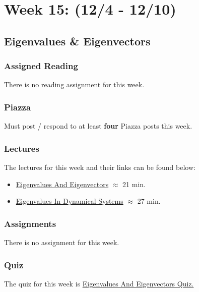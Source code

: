 \clearpage
\chapter{Week 15: (12/4 - 12/10)}

\section{Eigenvalues \& Eigenvectors}

\subsection{Assigned Reading}

There is no reading assignment for this week.

\subsection{Piazza}

Must post / respond to at least \textbf{four} Piazza posts this week.  

\subsection{Lectures}

The lectures for this week and their links can be found below:

\begin{itemize}
    \item \href{https://applied.cs.colorado.edu/mod/hvp/view.php?id=50826}{Eigenvalues And Eigenvectors} $\approx$ 21 min.
    \item \href{https://applied.cs.colorado.edu/mod/hvp/view.php?id=50827}{Eigenvalues In Dynamical Systems} $\approx$ 27 min.
\end{itemize}

\subsection{Assignments}

There is no assignment for this week.

\subsection{Quiz}

The quiz for this week is \href{https://applied.cs.colorado.edu/mod/quiz/view.php?id=52237}{Eigenvalues And Eigenvectors Quiz.}  
